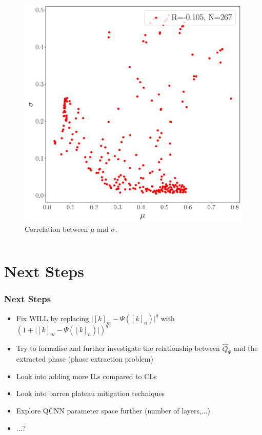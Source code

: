 \documentclass{beamer}
\begin{document}
\begin{frame}
\begin{columns}
\begin{column}{0.5\textwidth}
\begin{figure}
\includegraphics[width=\textwidth]{im/mu_v_sigma_}
\caption{Correlation between $\mu$ and $\sigma$.}
\end{figure}
\end{column}
\end{columns}
\end{frame}

\section{Next Steps}

\begin{frame}
\frametitle{Next Steps}
\begin{itemize}
\item Fix WILL by replacing $\Big|[k]_m - \Psi([k]_n) \Big|^q$ with $\left( 1 + \Big|[k]_m - \Psi([k]_n) \Big| \right)^q$ 
\item Try to formalise and further investigate the relationship between $\hat{Q}_\Psi$ and the extracted phase (phase extraction problem)
\item Look into adding more ILs compared to CLs 
\item Look into barren plateau mitigation techniques 
\item Explore QCNN parameter space further (number of layers,...)
\item ...? 
\end{itemize}
\end{frame}
\end{document}
